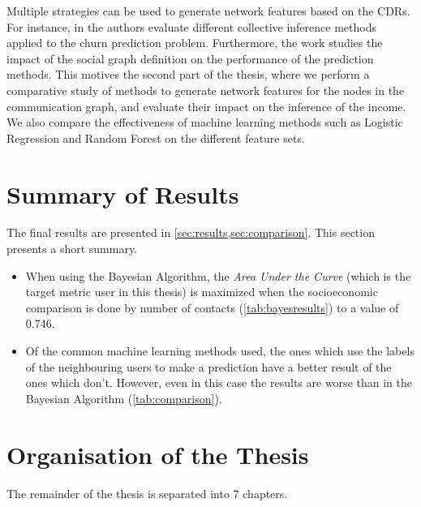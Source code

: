 Multiple strategies can be used to generate network features based on the CDRs. For instance, in \cite{oskarsdottir2016} the authors evaluate different collective inference methods applied to the churn prediction problem. Furthermore, the work \cite{oskarsdottir2017social} studies the impact of the social graph definition on the performance of the prediction methods. This motives the second part of the thesis, where we perform a comparative study of methods to generate network features for the nodes in the communication graph, and evaluate their impact on the inference of the income. We also compare the effectiveness of machine learning methods such as Logistic Regression and Random Forest on the different feature sets.

\section{Summary of Results}

The final results are presented in \cref{sec:results,sec:comparison}. This section presents a short summary.
\begin{itemize}
	\item When using the Bayesian Algorithm, the \emph{Area Under the Curve} (which is the target metric user in this thesis) is maximized when the socioeconomic comparison is done by number of contacts (\cref{tab:bayesresults}) to a value of \num{0.746}.
	\item Of the common machine learning methods used, the ones which use the labels of the neighbouring users to make a prediction have a better result of the ones which don't. However, even in this case the results are worse than in the Bayesian Algorithm (\cref{tab:comparison}).
\end{itemize}

\section{Organisation of the Thesis}

The remainder of the thesis is separated into 7 chapters.

